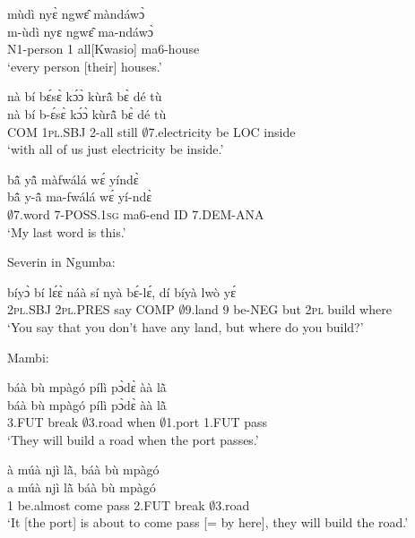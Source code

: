 \begin{exe} 
\exC\label{190} 
  \glll mùdì nyɛ̀ ngwɛ̂ màndáwɔ̀ \\
         m-ùdì nyɛ ngwɛ̂ ma-ndáwɔ̀ \\
         N1-person 1 all[Kwasio] ma6-house \\
    \trans `every person [their] houses.'
\end{exe}

\begin{exe} 
\exC\label{191}
  \glll nà bí bɛ́sɛ̀ kɔ́ɔ̀ kùrã̂  bɛ̀ dé tù \\
       nà bí b-ɛ́sɛ̀ kɔ́ɔ̀ kùrã̂  bɛ̀ dé tù \\
        COM 1\textsc{pl}.SBJ 2-all still $\emptyset$7.electricity  be LOC inside \\
    \trans `with all of us just electricity be inside.'
\end{exe}

\begin{exe} 
\exC\label{192}
  \glll bã̂ yã̂ màfwálá wɛ́ yíndɛ̀ \\
        bã̂ y-ã̂ ma-fwálá wɛ́ yí-ndɛ̀ \\
         $\emptyset$7.word 7-POSS.1\textsc{sg} ma6-end ID 7.DEM-ANA \\
    \trans `My last word is this.'
\end{exe}

\noindent Severin in Ngumba:

\begin{exe} 
\exC\label{193} 
  \gll bíyɔ̀ bí lɛ́ɛ̀ náà sí nyà bɛ́-lɛ́, dí bíyà lwò yɛ́ \\
        2\textsc{pl}.SBJ 2\textsc{pl}.PRES say COMP $\emptyset$9.land 9 be-NEG but 2\textsc{pl} build where  \\
    \trans `You say that you don't have any land, but where do you build?'
\end{exe}

\noindent Mambi:

\begin{exe} 
\exC\label{194} 
  \glll báà bù mpàgó pílì pɔ̀dɛ̀ àà lã̀ \\
      báà bù mpàgó pílì pɔ̀dɛ̀ àà lã̀ \\
        3.FUT break  $\emptyset$3.road when $\emptyset$1.port 1.FUT pass \\
    \trans `They will build a road when the port passes.'
\end{exe}

\begin{exe} 
\exC\label{195}
  \glll à múà njì lã̀, báà bù mpàgó \\
       a múà njì lã̀ báà bù mpàgó \\
        1 be.almost come pass 2.FUT break $\emptyset$3.road  \\
    \trans `It [the port] is about to come pass [= by here], they will build the road.'
\end{exe}

